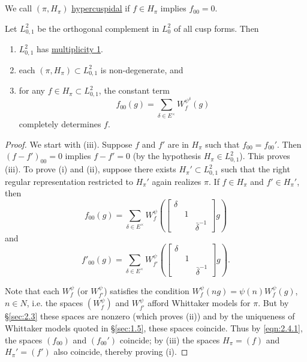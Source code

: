 \subsection{}
\label{sec:2.4}

\begin{definition}
We call $(\pi, H_\pi)$ \underline{hypercuspidal} if $f \in H_\pi$ implies $f_{00} = 0$.
\end{definition}

\begin{proposition}
Let $L_{0, 1}^{2}$ be the orthogonal complement in $L_{0}^{2}$ of all cusp forms. Then    
\begin{enumerate}[label=(\roman*)]
    \item $L_{0, 1}^{2}$ has \underline{multiplicity 1}.
    \item each $(\pi, H_\pi)\subset L_{0, 1}^{2}$ is non-degenerate, and
    \item for any $f \in H_\pi \subset L_{0, 1}^{2}$, the constant term
    \[
        f_{00}(g) = \sum_{\delta \in E^\times}W_{f}^{\psi^\delta}(g)
    \]
    completely determines $f$.
\end{enumerate}
\end{proposition}

\begin{proof}
We start with (iii).
Suppose $f$ and $f'$ are in $H_{\pi}$ such that $f_{00} = f_{00}'$.
Then $(f - f')_{00} = 0$ implies $f - f' = 0$ (by the hypothesis $H_\pi \in L_{0, 1}^{2}$). This proves (iii).
To prove (i) and (ii), suppose there exists $H_\pi' \subset L_{0, 1}^{2}$ such that the right regular representation restricted to $H_{\pi}'$ again realizes $\pi$.
If $f \in H_\pi$ and $f' \in H_{\pi}'$, then
\begin{equation}
\label{eqn:2.4.1}
    f_{00}(g) = \sum_{\delta \in E^\times} W_f^\psi\left(\begin{bmatrix}
        \delta & & \\ & 1 & \\ & & \bar{\delta}^{-1}
    \end{bmatrix}g\right)
\end{equation}
and
\[
    f'_{00}(g) = \sum_{\delta \in E^\times} W_{f'}^\psi\left(\begin{bmatrix}
        \delta & & \\ & 1 & \\ & & \bar{\delta}^{-1}
    \end{bmatrix}g\right).
\]

Note that each $W_f^\psi$ (or $W_{f'}^\psi$) satisfies the condition $W_f^\psi(ng) = \psi(n) W_f^\psi(g)$, $n \in N$, i.e. the spaces $(W_f^\psi)$ and $W_{f'}^\psi$ afford Whittaker models for $\pi$.
But by \S \ref{sec:2.3} these spaces are nonzero (which proves (ii)) and by the uniqueness of Whittaker models quoted in \S \ref{sec:1.5}, these spaces coincide.
Thus by \eqref{eqn:2.4.1}, the spaces $(f_{00})$ and $(f_{00}')$ coincide; by (iii) the spaces $H_\pi = (f)$ and $H_{\pi}' = (f')$ also coincide, thereby proving (i).
\end{proof}


